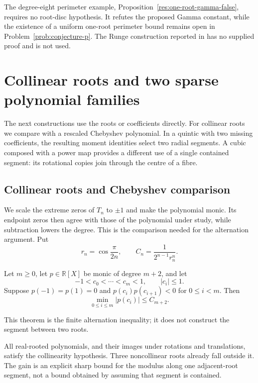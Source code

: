 \documentclass[11pt]{article}
\begin{document}
The degree-eight perimeter example, Proposition~\ref{res:one-root-gamma-false},
requires no root-disc hypothesis. It refutes the proposed Gamma constant,
while the existence of a uniform one-root perimeter bound remains open
in Problem~\ref{prob:conjecture-p}. The Runge construction reported in
\cite[Proposition~2]{revision2026} has no supplied proof and is not used.

\section{Collinear roots and two sparse polynomial families}
\label{sec:solved-polynomial-families}

The next constructions use the roots or coefficients directly. For
collinear roots we compare with a rescaled Chebyshev polynomial. In a
quintic with two missing coefficients, the resulting moment identities
select two radial segments. A cubic composed with a power map provides
a different use of a single contained segment: its rotational copies
join through the centre of a fibre.

\subsection{Collinear roots and Chebyshev comparison}
\label{subsec:sharp-collinear-chebyshev}

We scale the extreme zeros of $T_n$ to $\pm1$ and make the polynomial
monic. Its endpoint zeros then agree with those of the polynomial under
study, while subtraction lowers the degree. This is the comparison
needed for the alternation argument. Put
\[
 r_n=\cos\frac{\pi}{2n},
 \qquad C_n=\frac{1}{2^{n-1}r_n^n}.
\]

\begin{theorem}
\label{prop:sharp-collinear-chebyshev-comparator}
Let $m\ge0$, let $p\in\mathbb R[X]$ be monic of degree $m+2$, and let
\[
 -1<c_0<\cdots<c_m<1,\qquad |c_i|\le1.
\]
Suppose $p(-1)=p(1)=0$ and
$p(c_i)p(c_{i+1})<0$ for $0\le i<m$.  Then
\[
 \min_{0\le i\le m}|p(c_i)|\le C_{m+2}.
\]
\end{theorem}

This theorem is the finite alternation inequality; it does not construct
the segment between two roots.

All real-rooted polynomials, and their images under rotations and
translations, satisfy the collinearity hypothesis. Three noncollinear
roots already fall outside it. The gain is an explicit sharp bound for
the modulus along one adjacent-root segment, not a bound obtained by
assuming that segment is contained.
\end{document}
